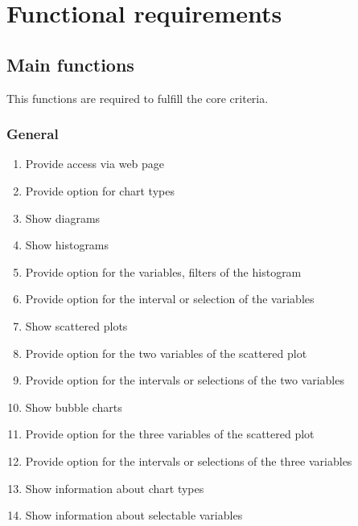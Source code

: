\section{Functional requirements}


\renewcommand{\theenumi}{/F\arabic{enumi}0/}
\renewcommand{\labelenumi}{\theenumi}

  
\subsection{Main functions}

This functions are required to fulfill the core criteria.
 
\subsubsection*{General}
\begin{enumerate}
  \item Provide access via web page\label{f1}
    
  \item Provide option for chart types\label{f2}
  
  \item Show diagrams\label{f3}
  
  \item Show histograms\label{f4} %
  
  \item Provide option for the variables, filters  of the histogram\label{f5}
  
  \item Provide option for the interval 
  or selection of the variables\label{f6} %
  
  \item Show scattered plots\label{f7} %
  
  \item Provide option for the 
  two variables of the scattered plot\label{f8}
  
  \item Provide option for the intervals 
  or selections of the two variables\label{f9} %
  
  \item Show bubble charts\label{f10} %
  
  \item Provide option for the three variables
   of the scattered plot\label{f11}
  
  \item Provide option for the intervals 
  or selections of the three variables\label{f12} %
  
  \item Show information about chart types\label{f13}
  
  \item Show information about selectable variables\label{f14}
  
\end{enumerate}


